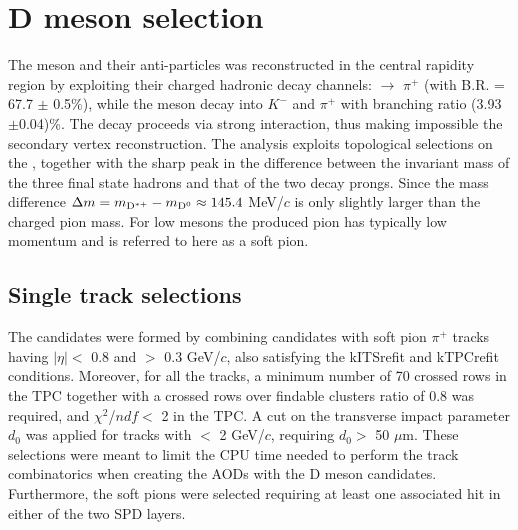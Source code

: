 \section{D meson selection}
The \Dstar meson and their anti-particles was reconstructed in the central rapidity region by exploiting their charged hadronic decay channels: \Dstar $\rightarrow$ \Dzero$\pi^{+}$ (with B.R. = 67.7 $\pm$ 0.5$\%$), while the \Dzero meson decay into $K^-$ and $\pi^{+}$ with branching ratio (3.93$\pm$0.04)\%. The \Dstar decay proceeds via strong interaction, thus making impossible the secondary vertex reconstruction. The analysis exploits topological selections on the \Dzero,  together with the sharp peak in the difference between the invariant mass of the three final state hadrons and that of the two \Dzero decay prongs. Since the mass difference $\Delta m = m_{\rm D^{\ast +}} - m_{\rm D^0} \approx 145.4$ MeV/$c$ is only slightly larger than the charged pion mass. For low \pt \Dstar mesons the produced pion has typically low momentum and is referred to here as a soft pion.



\subsection{Single track selections}
\label{sec:single_track}

The \Dstar candidates were formed by combining \Dzero candidates with soft pion $\pi^{+}$ tracks having $|\eta| <$ 0.8 and \pt $>$ 0.3 GeV/$c$, also satisfying the kITSrefit and kTPCrefit conditions. Moreover, for all the tracks, a minimum number of 70 crossed rows in the TPC together with a crossed rows over findable clusters ratio of 0.8 was required, and $\chi^2$/$ndf <$ 2 in the TPC. A cut on the transverse impact parameter $d_0$ was applied for tracks with \pt $<$ 2 GeV/$c$, requiring $d_0 >$ 50 $\mu$m. These selections were meant to limit the CPU time needed to perform the track combinatorics when creating the AODs with the D meson candidates. Furthermore, the \Dstar soft pions were selected requiring at least one associated hit in either of the two SPD layers.


